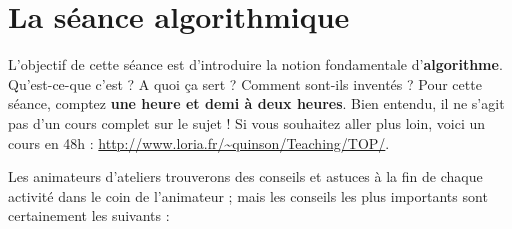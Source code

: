 \documentclass[a5paper,pagesize,DIV=14]{scrbook}
\begin{document}

\section*{La séance algorithmique}

L'objectif de cette séance est d'introduire la notion fondamentale
d'\textbf{al\-gorithme}. Qu'est-ce-que c'est ? A quoi ça sert ? Comment sont-ils
inventés ? Pour cette séance, comptez \textbf{une heure et demi à deux
  heures}. Bien entendu, il ne s'agit pas d'un cours complet sur le sujet ! Si
vous souhaitez aller plus loin, voici un cours en 48h :
\url{http://www.loria.fr/~quinson/Teaching/TOP/}.

Les animateurs d'ateliers trouverons des conseils et astuces à la fin de chaque
activité dans \og le coin de l'animateur \fg ; mais les conseils les plus
importants sont certainement les suivants :
\end{document}

